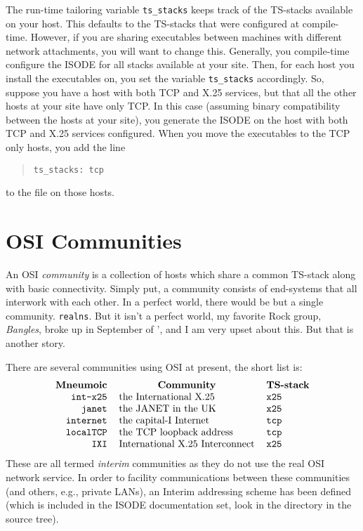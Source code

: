 The run-time tailoring variable \verb"ts_stacks" keeps track of the
TS-stacks available on your host.
This defaults to the TS-stacks that were configured at compile-time.
However, if you are sharing executables between machines with different
network attachments,
you will want to change this.
Generally,
you compile-time configure the ISODE for all stacks available at your site.
Then,
for each host you install the executables on,
you set the variable \verb"ts_stacks" accordingly.
So, suppose you have a host with both TCP and X.25 services,
but that all the other hosts at your site have only TCP.
In this case
(assuming binary compatibility between the hosts at your site),
you generate the ISODE on the host with both TCP and X.25 services configured.
When you move the executables to the TCP only hosts,
you add the line
\begin{quote}\small\begin{verbatim}
ts_stacks: tcp
\end{verbatim}\end{quote}
to the  file on those hosts.

\section	{OSI Communities}
An OSI {\em community\/} is a collection of hosts which share a common TS-stack
along with basic connectivity.
Simply put,
a community consists of end-systems that all interwork with each other.
In a perfect world,
there would be but a single community.
\verb"realns".
But it isn't a perfect world,
my favorite Rock group, {\em Bangles}, broke up in September
of '{}, and I am very upset about this.
But that is another story.

There are several communities using OSI at present,
the short list is:
\[\begin{tabular}{rll}
\multicolumn{1}{c}{\bf Mneumoic}&
		\multicolumn{1}{c}{\bf Community}&
					\multicolumn{1}{c}{\bf TS-stack}\\
\verb"int-x25"&	the International X.25&	\verb"x25"\\
\verb"janet"&	the JANET in the UK&	\verb"x25"\\
\verb"internet"& the capital-I Internet&\verb"tcp"\\
\verb"localTCP"& the TCP loopback address&
					\verb"tcp"\\
\verb"IXI"&	International X.25 Interconnect&
					\verb"x25"
\end{tabular}\]
These are all termed {\em interim\/} communities as they do not use the real
OSI network service.
In order to facility communications between these communities
(and others, e.g., private LANs),
an Interim addressing scheme has been defined \cite{Interim.Addresses}
(which is included in the ISODE documentation set,
look in the directory  in the source tree).

